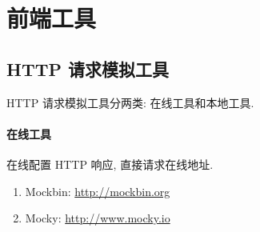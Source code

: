 \section{前端工具}

\subsection{HTTP 请求模拟工具}

HTTP 请求模拟工具分两类: 在线工具和本地工具.

\paragraph{在线工具} 在线配置 HTTP 响应, 直接请求在线地址.
\begin{enumerate}
    \item Mockbin: \url{http://mockbin.org}
    \item Mocky: \url{http://www.mocky.io}
\end{enumerate}